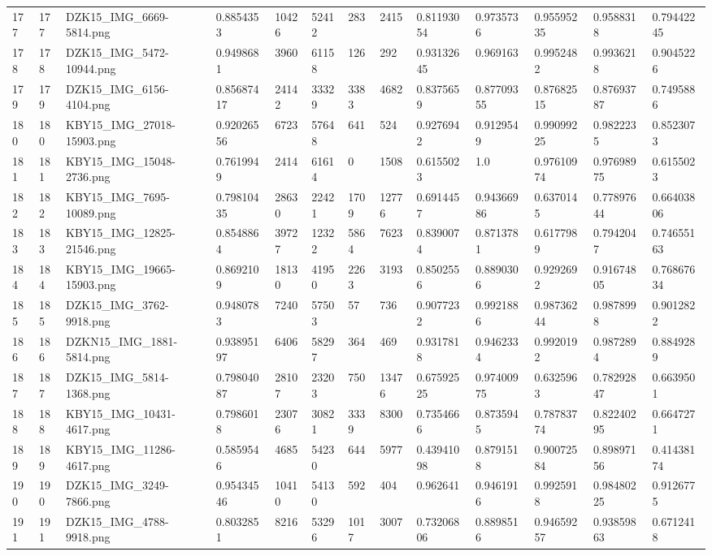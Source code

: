 \documentclass[11pt, a4paper, twoside]{report}
\begin{document}
\begin{longtable}[c]{@{}lllllllllllll@{}}
177 & 177 & DZK15\_IMG\_6669-5814.png & 0.8854353 & 10426 & 52412 & 283 & 2415 & 0.81193054 & 0.9735736 & 0.95595235 & 0.9588318 & 0.79442245 \\
178 & 178 & DZK15\_IMG\_5472-10944.png & 0.9498681 & 3960 & 61158 & 126 & 292 & 0.93132645 & 0.969163 & 0.9952482 & 0.9936218 & 0.9045226 \\
179 & 179 & DZK15\_IMG\_6156-4104.png & 0.85687417 & 24142 & 33329 & 3383 & 4682 & 0.8375659 & 0.87709355 & 0.87682515 & 0.87693787 & 0.7495886 \\
180 & 180 & KBY15\_IMG\_27018-15903.png & 0.92026556 & 6723 & 57648 & 641 & 524 & 0.9276942 & 0.9129549 & 0.99099225 & 0.9822235 & 0.8523073 \\
181 & 181 & KBY15\_IMG\_15048-2736.png & 0.7619949 & 2414 & 61614 & 0 & 1508 & 0.6155023 & 1.0 & 0.97610974 & 0.97698975 & 0.6155023 \\
182 & 182 & KBY15\_IMG\_7695-10089.png & 0.79810435 & 28630 & 22421 & 1709 & 12776 & 0.6914457 & 0.94366986 & 0.6370145 & 0.77897644 & 0.66403806 \\
183 & 183 & KBY15\_IMG\_12825-21546.png & 0.8548864 & 39727 & 12322 & 5864 & 7623 & 0.8390074 & 0.8713781 & 0.6177989 & 0.7942047 & 0.74655163 \\
184 & 184 & KBY15\_IMG\_19665-15903.png & 0.8692109 & 18130 & 41950 & 2263 & 3193 & 0.8502556 & 0.8890306 & 0.9292692 & 0.91674805 & 0.76867634 \\
185 & 185 & DZK15\_IMG\_3762-9918.png & 0.9480783 & 7240 & 57503 & 57 & 736 & 0.9077232 & 0.9921886 & 0.98736244 & 0.9878998 & 0.9012822 \\
186 & 186 & DZKN15\_IMG\_1881-5814.png & 0.93895197 & 6406 & 58297 & 364 & 469 & 0.9317818 & 0.9462334 & 0.9920192 & 0.9872894 & 0.8849289 \\
187 & 187 & DZK15\_IMG\_5814-1368.png & 0.79804087 & 28107 & 23203 & 750 & 13476 & 0.67592525 & 0.97400975 & 0.6325963 & 0.78292847 & 0.6639501 \\
188 & 188 & KBY15\_IMG\_10431-4617.png & 0.7986018 & 23076 & 30821 & 3339 & 8300 & 0.7354666 & 0.8735945 & 0.78783774 & 0.82240295 & 0.6647271 \\
189 & 189 & KBY15\_IMG\_11286-4617.png & 0.5859546 & 4685 & 54230 & 644 & 5977 & 0.43941098 & 0.8791518 & 0.90072584 & 0.89897156 & 0.41438174 \\
190 & 190 & DZK15\_IMG\_3249-7866.png & 0.95434546 & 10410 & 54130 & 592 & 404 & 0.962641 & 0.9461916 & 0.9925918 & 0.98480225 & 0.9126775 \\
191 & 191 & DZK15\_IMG\_4788-9918.png & 0.8032851 & 8216 & 53296 & 1017 & 3007 & 0.73206806 & 0.8898516 & 0.94659257 & 0.93859863 & 0.6712418 \\

\end{longtable}
\end{document}
